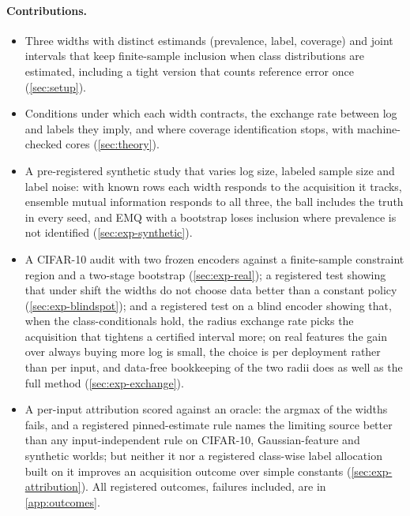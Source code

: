 \paragraph{Contributions.}
\begin{itemize}
\item Three widths with distinct estimands (prevalence, label, coverage) and joint intervals that keep
finite-sample inclusion when class distributions are estimated, including a tight version that counts
reference error once (\cref{sec:setup}).
\item Conditions under which each width contracts, the exchange rate between log and labels they imply,
and where coverage identification stops, with machine-checked cores (\cref{sec:theory}).
\item A pre-registered synthetic study that varies log size, labeled sample size and label noise: with
known rows each width responds to the acquisition it tracks, ensemble mutual information responds to all
three, the ball includes the truth in every seed, and EMQ with a bootstrap loses inclusion where
prevalence is not identified (\cref{sec:exp-synthetic}).
\item A CIFAR-10 audit with two frozen encoders against a finite-sample constraint region and a
two-stage bootstrap (\cref{sec:exp-real}); a registered test showing that under shift the widths do not
choose data better than a constant policy (\cref{sec:exp-blindspot}); and a registered test on a blind
encoder showing that, when the class-conditionals hold, the radius exchange rate picks the acquisition
that tightens a certified interval more; on real features the gain over always buying more log is small,
the choice is per deployment rather than per input, and data-free bookkeeping of the two radii does as
well as the full method (\cref{sec:exp-exchange}).
\item A per-input attribution scored against an oracle: the argmax of the widths fails, and a registered
pinned-estimate rule names the limiting source better than any input-independent rule on CIFAR-10,
Gaussian-feature and synthetic worlds; but neither it nor a registered class-wise label allocation built on
it improves an acquisition outcome over simple constants (\cref{sec:exp-attribution}). All registered
outcomes, failures included, are in \cref{app:outcomes}.
\end{itemize}
